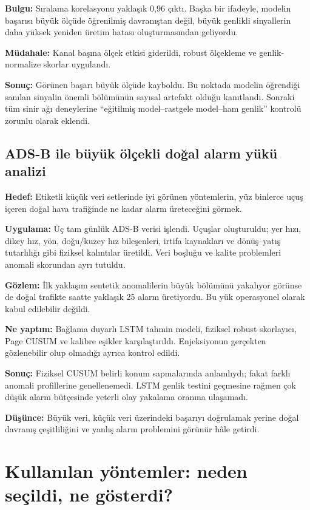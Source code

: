 \documentclass[11pt,a4paper]{article}
\begin{document}
\textbf{Bulgu:} Sıralama korelasyonu yaklaşık 0{,}96 çıktı. Başka bir ifadeyle,
modelin başarısı büyük ölçüde öğrenilmiş davranıştan değil, büyük genlikli
sinyallerin daha yüksek yeniden üretim hatası oluşturmasından geliyordu.

\textbf{Müdahale:} Kanal başına ölçek etkisi giderildi, robust ölçekleme ve
genlik-normalize skorlar uygulandı.

\textbf{Sonuç:} Görünen başarı büyük ölçüde kayboldu. Bu noktada modelin
öğrendiği sanılan sinyalin önemli bölümünün sayısal artefakt olduğu kanıtlandı.
Sonraki tüm sinir ağı deneylerine ``eğitilmiş model--rastgele model--ham
genlik'' kontrolü zorunlu olarak eklendi.

\subsection{ADS-B ile büyük ölçekli doğal alarm yükü analizi}

\textbf{Hedef:} Etiketli küçük veri setlerinde iyi görünen yöntemlerin, yüz
binlerce uçuş içeren doğal hava trafiğinde ne kadar alarm üreteceğini görmek.

\textbf{Uygulama:} Üç tam günlük ADS-B verisi işlendi. Uçuşlar oluşturuldu;
yer hızı, dikey hız, yön, doğu/kuzey hız bileşenleri, irtifa kaynakları ve
dönüş--yatış tutarlılığı gibi fiziksel kalıntılar üretildi. Veri boşluğu ve
kalite problemleri anomali skorundan ayrı tutuldu.

\textbf{Gözlem:} İlk yaklaşım sentetik anomalilerin büyük bölümünü yakalıyor
görünse de doğal trafikte saatte yaklaşık 25 alarm üretiyordu. Bu yük operasyonel
olarak kabul edilebilir değildi.

\textbf{Ne yaptım:} Bağlama duyarlı LSTM tahmin modeli, fiziksel robust skorlayıcı,
Page CUSUM ve kalibre eşikler karşılaştırıldı. Enjeksiyonun gerçekten gözlenebilir
olup olmadığı ayrıca kontrol edildi.

\textbf{Sonuç:} Fiziksel CUSUM belirli konum sapmalarında anlamlıydı; fakat
farklı anomali profillerine genellenemedi. LSTM genlik testini geçmesine rağmen
çok düşük alarm bütçesinde yeterli olay yakalama oranına ulaşamadı.

\textbf{Düşünce:} Büyük veri, küçük veri üzerindeki başarıyı doğrulamak yerine
doğal davranış çeşitliliğini ve yanlış alarm problemini görünür hâle getirdi.

\section{Kullanılan yöntemler: neden seçildi, ne gösterdi?}
\end{document}

